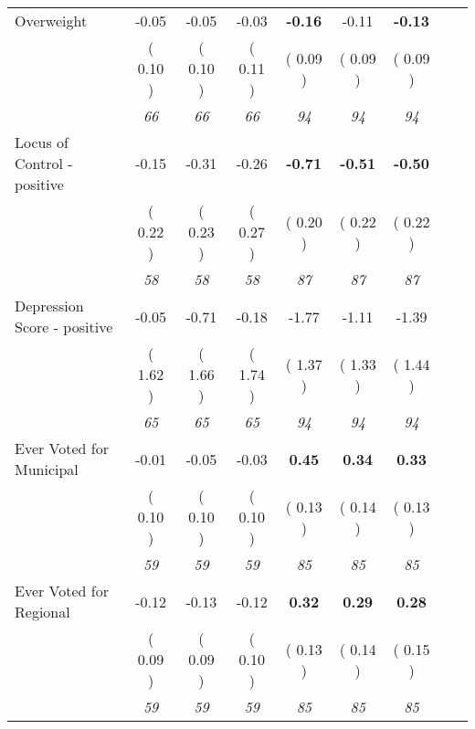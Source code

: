 \begin{tabular}{l c c c c c c c c}
Overweight &     -0.05 &     -0.05 &     -0.03 & \textbf{     -0.16 } &     -0.11 & \textbf{     -0.13 } \\
& (     0.10 ) & (     0.10 ) & (     0.11 ) & (     0.09 ) & (     0.09 ) & (     0.09 ) \\
& \textit{ 66 } & \textit{ 66 } & \textit{ 66 } & \textit{ 94 } & \textit{ 94 } & \textit{ 94 } \\
Locus of Control - positive &     -0.15 &     -0.31 &     -0.26 & \textbf{     -0.71 } & \textbf{     -0.51 } & \textbf{     -0.50 } \\
& (     0.22 ) & (     0.23 ) & (     0.27 ) & (     0.20 ) & (     0.22 ) & (     0.22 ) \\
& \textit{ 58 } & \textit{ 58 } & \textit{ 58 } & \textit{ 87 } & \textit{ 87 } & \textit{ 87 } \\
Depression Score - positive &     -0.05 &     -0.71 &     -0.18 &     -1.77 &     -1.11 &     -1.39 \\
& (     1.62 ) & (     1.66 ) & (     1.74 ) & (     1.37 ) & (     1.33 ) & (     1.44 ) \\
& \textit{ 65 } & \textit{ 65 } & \textit{ 65 } & \textit{ 94 } & \textit{ 94 } & \textit{ 94 } \\
Ever Voted for Municipal &     -0.01 &     -0.05 &     -0.03 & \textbf{      0.45 } & \textbf{      0.34 } & \textbf{      0.33 } \\
& (     0.10 ) & (     0.10 ) & (     0.10 ) & (     0.13 ) & (     0.14 ) & (     0.13 ) \\
& \textit{ 59 } & \textit{ 59 } & \textit{ 59 } & \textit{ 85 } & \textit{ 85 } & \textit{ 85 } \\
Ever Voted for Regional &     -0.12 &     -0.13 &     -0.12 & \textbf{      0.32 } & \textbf{      0.29 } & \textbf{      0.28 } \\
& (     0.09 ) & (     0.09 ) & (     0.10 ) & (     0.13 ) & (     0.14 ) & (     0.15 ) \\
& \textit{ 59 } & \textit{ 59 } & \textit{ 59 } & \textit{ 85 } & \textit{ 85 } & \textit{ 85 } \\
\bottomrule
\end{tabular}
